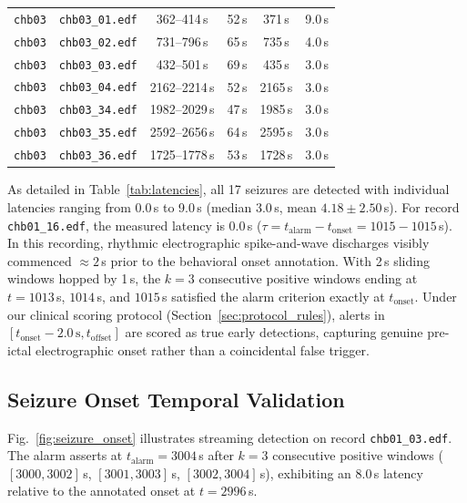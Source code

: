 \documentclass[10pt,twocolumn,letterpaper]{article}
\begin{document}
\begin{table}[t]
{\begin{tabular}{lccccc}
\midrule
\texttt{chb03} & \texttt{chb03\_01.edf} & 362--414\,s   & 52\,s & 371\,s  & 9.0\,s \\
\texttt{chb03} & \texttt{chb03\_02.edf} & 731--796\,s   & 65\,s & 735\,s  & 4.0\,s \\
\texttt{chb03} & \texttt{chb03\_03.edf} & 432--501\,s   & 69\,s & 435\,s  & 3.0\,s \\
\texttt{chb03} & \texttt{chb03\_04.edf} & 2162--2214\,s & 52\,s & 2165\,s & 3.0\,s \\
\texttt{chb03} & \texttt{chb03\_34.edf} & 1982--2029\,s & 47\,s & 1985\,s & 3.0\,s \\
\texttt{chb03} & \texttt{chb03\_35.edf} & 2592--2656\,s & 64\,s & 2595\,s & 3.0\,s \\
\texttt{chb03} & \texttt{chb03\_36.edf} & 1725--1778\,s & 53\,s & 1728\,s & 3.0\,s \\
\bottomrule
\end{tabular}%
}
\end{table}

As detailed in Table~\ref{tab:latencies}, all 17 seizures are detected with individual latencies ranging from 0.0\,s to 9.0\,s (median 3.0\,s, mean $4.18 \pm 2.50$\,s). For record \texttt{chb01\_16.edf}, the measured latency is 0.0\,s ($\tau = t_{\text{alarm}} - t_{\text{onset}} = 1015 - 1015$\,s). In this recording, rhythmic electrographic spike-and-wave discharges visibly commenced $\approx 2$\,s prior to the behavioral onset annotation. With 2\,s sliding windows hopped by 1\,s, the $k=3$ consecutive positive windows ending at $t = 1013$\,s, $1014$\,s, and $1015$\,s satisfied the alarm criterion exactly at $t_{\text{onset}}$. Under our clinical scoring protocol (Section~\ref{sec:protocol_rules}), alerts in $[t_{\text{onset}} - 2.0\,\text{s}, t_{\text{offset}}]$ are scored as true early detections, capturing genuine pre-ictal electrographic onset rather than a coincidental false trigger.

\subsection{Seizure Onset Temporal Validation}

Fig.~\ref{fig:seizure_onset} illustrates streaming detection on record \texttt{chb01\_03.edf}. The alarm asserts at $t_{\text{alarm}} = 3004$\,s after $k=3$ consecutive positive windows ($[3000, 3002]$\,s, $[3001, 3003]$\,s, $[3002, 3004]$\,s), exhibiting an 8.0\,s latency relative to the annotated onset at $t=2996$\,s.
\end{document}
